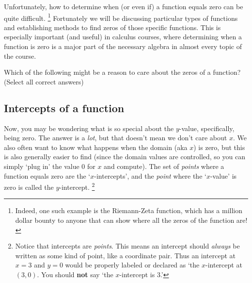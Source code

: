 \documentclass{ximera}
\begin{document}
    Unfortunately, how to determine when (or even if) a function equals zero can be quite difficult.%
    \footnote{%
        Indeed, one such example is the Riemann-Zeta function, which has a million dollar bounty to anyone that can show where all the zeros of the function are!
        }
    Fortunately we will be discussing particular types of functions and establishing methods to find zeros of those specific functions. This is especially important (and useful) in calculus courses, where determining when a function is zero is a major part of the necessary algebra in almost every topic of the course.
    
    \begin{problem}
        Which of the following might be a reason to care about the zeros of a function? (Select all correct answers)
        \begin{multipleChoice}
        \end{multipleChoice}
    \end{problem}

\subsection*{Intercepts of a function}
    Now, you may be wondering what is so special about the $y$-value, specifically, being zero. The answer is a \textit{lot}, but that doesn't mean we don't care about $x$. We also often want to know what happens when the domain (aka $x$) is zero, but this is also generally easier to find (since the domain values are controlled, so you can simply `plug in' the value 0 for $x$ and compute). The set of \textit{points} where a function equals zero are the `$x$-intercepts', and the \textit{point} where the `$x$-value' is zero is called the $y$-intercept.%
    \footnote{%
        Notice that intercepts are \textit{points}. This means an intercept should \textit{always} be written as some kind of point, like a coordinate pair. Thus an intercept at $x=3$ and $y=0$ would be properly labeled or declared as `the $x$-intercept at $(3,0)$. You should \textbf{not} say `the $x$-intercept is 3.'%
        }
        
\end{document}
